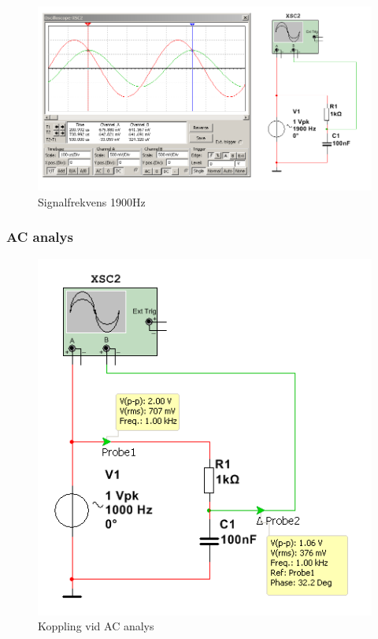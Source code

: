 \documentclass[11pt,a4paper]{article}
\begin{document}
\begin{figure}[htbp]
    \centering
    \includegraphics[scale=0.5]{ee466multisim/5-1900Hz.png}
    \caption{Signalfrekvens 1900Hz}
    \label{fig:sim-5-1900Hz}
\end{figure}


\subsubsection{AC analys}
\begin{figure}[htbp]
    \centering
    \includegraphics[scale=0.5]{ee466multisim/5-ACprobes.png}
    \caption{Koppling vid AC analys}
    \label{fig:sim-5-ACanalysis-setup}
\end{figure}
\end{document}
